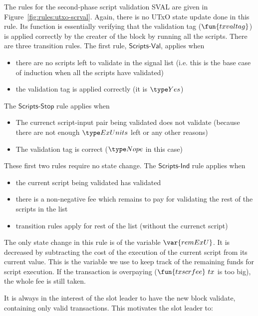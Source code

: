 The rules for the second-phase script validation SVAL are given in
Figure~\ref{fig:rules:utxo-scrval}. Again, there is no UTxO state update
done in this rule. Its function is essentially verifying that the
validation tag ($\fun{txvaltag}$) is applied correctly by the creater of
the block by running all the scripts. There are three transition rules.
The first rule, $\mathsf{Scripts\mbox{-}Val}$, applies when

\begin{itemize}
\item there
are no scripts left to validate in the signal list (i.e. this is the base case of
induction when all the scripts have validated)
\item the validation tag is applied correctly (it is $\Yes$)
\end{itemize}

The $\mathsf{Scripts\mbox{-}Stop}$ rule applies when

\begin{itemize}
  \item The currenct script-input pair being validated does not validate
  (because there are not enough $\ExUnits$ left or any other reasons)
  \item The validation tag is correct ($\Nope$ in this case)
\end{itemize}

These first two rules require no state change.
The $\mathsf{Scripts\mbox{-}Ind}$ rule applies when

\begin{itemize}
  \item the current script being validated has validated
  \item there is a non-negative fee which remains to pay for validating
  the rest of the scripts in the list
  \item transition rules apply for rest of the list (without the currenct script)
\end{itemize}

The only state change in this rule is of the variable $\var{remExU}$.
It is decreased by subtracting the cost of the execution of the
current script from its current value.
This is the variable we use to keep track of the remaining funds for
script execution. If the transaction is overpaying ($\fun{txscrfee}~{tx}$
is too big), the whole fee is still taken.

It is always in the interest of the slot leader to have the new block validate,
containing only valid transactions. This motivates the
slot leader to:

